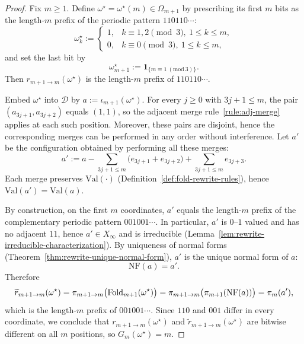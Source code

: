 \begin{proof}
Fix $m\ge 1$.
Define $\omega^\star=\omega^\star(m)\in\Omega_{m+1}$ by prescribing its first $m$ bits as the length-$m$ prefix of the periodic pattern $110110\cdots$:
\[
\omega^\star_k:=
\begin{cases}
1,& k\equiv 1,2\pmod 3,\ 1\le k\le m,\\
0,& k\equiv 0\pmod 3,\ 1\le k\le m,
\end{cases}
\]
and set the last bit by
\[
\omega^\star_{m+1}:=\mathbf 1_{\{m\equiv 1\ (\mathrm{mod}\ 3)\}}.
\]
Then $r_{m+1\to m}(\omega^\star)$ is the length-$m$ prefix of $110110\cdots$.

Embed $\omega^\star$ into $\mathcal{D}$ by $a:=\iota_{m+1}(\omega^\star)$.
For every $j\ge 0$ with $3j+1\le m$, the pair $(a_{3j+1},a_{3j+2})$ equals $(1,1)$, so the adjacent merge rule~\eqref{rule:adj-merge} applies at each such position.
Moreover, these pairs are disjoint, hence the corresponding merges can be performed in any order without interference.
Let $a'$ be the configuration obtained by performing all these merges:
\[
a':=a-\sum_{3j+1\le m}\bigl(e_{3j+1}+e_{3j+2}\bigr)+\sum_{3j+1\le m}e_{3j+3}.
\]
Each merge preserves $\mathrm{Val}(\cdot)$ (Definition~\ref{def:fold-rewrite-rules}), hence $\mathrm{Val}(a')=\mathrm{Val}(a)$.

By construction, on the first $m$ coordinates, $a'$ equals the length-$m$ prefix of the complementary periodic pattern $001001\cdots$.
In particular, $a'$ is $0$--$1$ valued and has no adjacent $11$, hence $a'\in X_\infty$ and is irreducible (Lemma~\ref{lem:rewrite-irreducible-characterization}).
By uniqueness of normal forms (Theorem~\ref{thm:rewrite-unique-normal-form}), $a'$ is the unique normal form of $a$:
\[
\mathrm{NF}(a)=a'.
\]
Therefore
\[
\widetilde r_{m+1\to m}(\omega^\star)=\pi_{m+1\to m}\bigl(\mathrm{Fold}_{m+1}(\omega^\star)\bigr)
=\pi_{m+1\to m}\bigl(\pi_{m+1}(\mathrm{NF}(a))\bigr)
=\pi_m(a'),
\]
which is the length-$m$ prefix of $001001\cdots$.
Since $110$ and $001$ differ in every coordinate, we conclude that $r_{m+1\to m}(\omega^\star)$ and $\widetilde r_{m+1\to m}(\omega^\star)$ are bitwise different on all $m$ positions, so $G_m(\omega^\star)=m$.
\end{proof}


